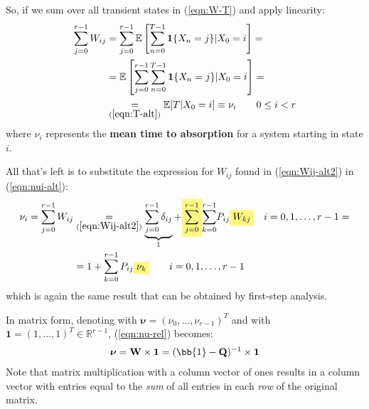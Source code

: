 \documentclass[../template.tex]{subfiles}
\begin{document}
So, if we sum over all transient states in (\ref{eqn:W-T}) and apply linearity:
\begin{align} \nonumber
    \sum_{j=0}^{r-1} W_{ij} &= \sum_{j=0}^{r-1} \mathbb{E}\left[\sum_{n=0}^{T-1} \textbf{1}\{X_n=j\}|X_0 = i  \right] =\\ \nonumber 
    &= \mathbb{E}\left[ \sum_{j=0}^{r-1} \sum_{n=0}^{T-1}\textbf{1}\{X_n=j\}|X_0 = i \right] =\\
    &\underset{(\ref{eqn:T-alt})}{=} \mathbb{E}[T|X_0 = i] \equiv \nu_i \qquad 0 \leq i < r \label{eqn:nui-alt}
\end{align}
where $\nu_i$ represents the \textbf{mean time to absorption} for a system starting in state $i$. 

\medskip

All that's left is to substitute the expression for $W_{ij}$ found in (\ref{eqn:Wij-alt2}) in (\ref{eqn:nui-alt}):
\begin{align} \nonumber
    \nu_i = \sum_{j=0}^{r-1} W_{ij} &\underset{(\ref{eqn:Wij-alt2})}{=} \underbrace{\sum_{j=0}^{r-1} \delta_{ij}}_{1}  + \hlc{Yellow}{\sum_{j=0}^{r-1}} {\sum_{k=0}^{r-1}} P_{ij} \hlc{Yellow}{W_{kj}} \quad i = 0,1,\dots, r-1 =\\
    &= 1 + \sum_{k=0}^{r-1} P_{ij} \hlc{Yellow}{\nu_k} \qquad i = 0,1,\dots, r-1 \label{eqn:nu-rel}
\end{align}
which is again the same result that can be obtained by first-step analysis.

\medskip

In matrix form, denoting with $\bm{\nu} = (\nu_0, \dots, \nu_{r-1})^T$ and with $\textbf{1} = (1,\dots,1)^T \in \mathbb{R}^{r-1}$, (\ref{eqn:nu-rel}) becomes:
\begin{align}\label{eqn:nu-mtx}
    \bm{\nu} = \textbf{W} \times \textbf{1} = (\bb{1} - \textbf{Q})^{-1} \times \textbf{1} 
\end{align}
Note that matrix multiplication with a column vector of ones results in a column vector with entries equal to the \textit{sum} of all entries in each \textit{row} of the original matrix.

\medskip
\end{document}
